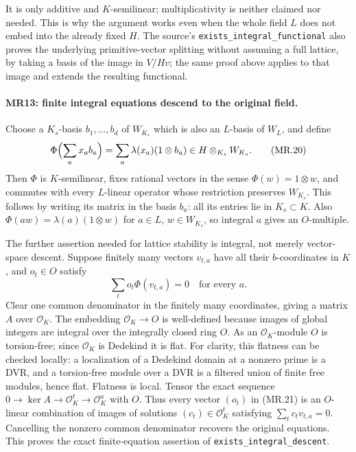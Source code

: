 It is only additive and $K$-semilinear; multiplicativity is neither
claimed nor needed. This is why the argument works even when the
whole field $L$ does not embed into the already fixed $H$.
The source's \texttt{exists\_integral\_functional} also proves the
underlying primitive-vector splitting without assuming a full
lattice, by taking a basis of the image in $V/Hv$; the same proof
above applies to that image and extends the resulting functional.

\paragraph{MR13: finite integral equations descend to the original field.}
Choose a $K_s$-basis $b_1,\ldots,b_d$ of $W_{K_s}$ which is also
an $L$-basis of $W_L$, and define
\[
 \Phi\Bigl(\sum_a x_a b_a\Bigr)
           =\sum_a\lambda(x_a)(1\otimes b_a)
       \in H\otimes_{K_s}W_{K_s}.                  \tag{MR.20}
\]
Then $\Phi$ is $K$-semilinear, fixes rational vectors in the sense
$\Phi(w)=1\otimes w$, and commutes with every $L$-linear operator
whose restriction preserves $W_{K_s}$. This follows by writing its
matrix in the basis $b_a$: all its entries lie in $K_s\subset K$.
Also $\Phi(aw)=\lambda(a)(1\otimes w)$ for
$a\in L$, $w\in W_{K_s}$, so integral $a$ gives an $O$-multiple.

The further assertion needed for lattice stability is integral,
not merely vector-space descent. Suppose finitely many vectors
$v_{t,a}$ have all their $b$-coordinates in $K$, and
$o_t\in O$ satisfy
\[
                    \sum_t o_t\Phi(v_{t,a})=0
                                      \quad\text{for every }a.
                                                               \tag{MR.21}
\]
Clear one common denominator in the finitely many coordinates,
giving a matrix $A$ over $\mathcal O_K$. The embedding
$\mathcal O_K\to O$ is well-defined because images of global
integers are integral over the integrally closed ring $O$.
As an $\mathcal O_K$-module $O$ is torsion-free; since
$\mathcal O_K$ is Dedekind it is flat. For clarity, this flatness
can be checked locally: a localization of a Dedekind domain at a
nonzero prime is a DVR, and a torsion-free module over a DVR is a
filtered union of finite free modules, hence flat. Flatness is local.
Tensor the exact sequence
$0\to\ker A\to\mathcal O_K^t\to\mathcal O_K^a$ with $O$.
Thus every vector $(o_t)$ in (MR.21) is an $O$-linear combination
of images of solutions $(c_t)\in\mathcal O_K^t$ satisfying
$\sum_t c_tv_{t,a}=0$. Cancelling the nonzero common denominator
recovers the original equations. This proves the exact
finite-equation assertion of \texttt{exists\_integral\_descent}.

